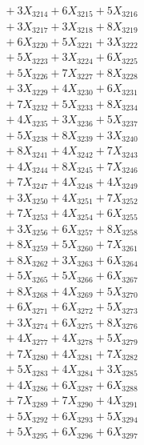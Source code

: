 \documentclass[a4paper,10pt]{article}
\begin{document}
{\begin{align}
&\;  + 3 X_{3214} + 6 X_{3215} + 5 X_{3216} \\[0.3ex]
&\;  + 3 X_{3217} + 3 X_{3218} + 8 X_{3219} \\[0.5ex]\allowbreak
&\;  + 6 X_{3220} + 5 X_{3221} + 3 X_{3222} \\[0.3ex]
&\;  + 5 X_{3223} + 3 X_{3224} + 6 X_{3225} \\[0.3ex]
&\;  + 5 X_{3226} + 7 X_{3227} + 8 X_{3228} \\[0.3ex]
&\;  + 3 X_{3229} + 4 X_{3230} + 6 X_{3231} \\[0.3ex]
&\;  + 7 X_{3232} + 5 X_{3233} + 8 X_{3234} \\[0.3ex]
&\;  + 4 X_{3235} + 3 X_{3236} + 5 X_{3237} \\[0.3ex]
&\;  + 5 X_{3238} + 8 X_{3239} + 3 X_{3240} \\[0.3ex]
&\;  + 8 X_{3241} + 4 X_{3242} + 7 X_{3243} \\[0.3ex]
&\;  + 4 X_{3244} + 8 X_{3245} + 7 X_{3246} \\[0.3ex]
&\;  + 7 X_{3247} + 4 X_{3248} + 4 X_{3249} \\[0.5ex]\allowbreak
&\;  + 3 X_{3250} + 4 X_{3251} + 7 X_{3252} \\[0.3ex]
&\;  + 7 X_{3253} + 4 X_{3254} + 6 X_{3255} \\[0.3ex]
&\;  + 3 X_{3256} + 6 X_{3257} + 8 X_{3258} \\[0.3ex]
&\;  + 8 X_{3259} + 5 X_{3260} + 7 X_{3261} \\[0.3ex]
&\;  + 8 X_{3262} + 3 X_{3263} + 6 X_{3264} \\[0.3ex]
&\;  + 5 X_{3265} + 5 X_{3266} + 6 X_{3267} \\[0.3ex]
&\;  + 8 X_{3268} + 4 X_{3269} + 5 X_{3270} \\[0.3ex]
&\;  + 6 X_{3271} + 6 X_{3272} + 5 X_{3273} \\[0.3ex]
&\;  + 3 X_{3274} + 6 X_{3275} + 8 X_{3276} \\[0.3ex]
&\;  + 4 X_{3277} + 4 X_{3278} + 5 X_{3279} \\[0.5ex]\allowbreak
&\;  + 7 X_{3280} + 4 X_{3281} + 7 X_{3282} \\[0.3ex]
&\;  + 5 X_{3283} + 4 X_{3284} + 3 X_{3285} \\[0.3ex]
&\;  + 4 X_{3286} + 6 X_{3287} + 6 X_{3288} \\[0.3ex]
&\;  + 7 X_{3289} + 7 X_{3290} + 4 X_{3291} \\[0.3ex]
&\;  + 5 X_{3292} + 6 X_{3293} + 5 X_{3294} \\[0.3ex]
&\;  + 5 X_{3295} + 6 X_{3296} + 6 X_{3297} \\[0.3ex]

\end{align}}
\end{document}
